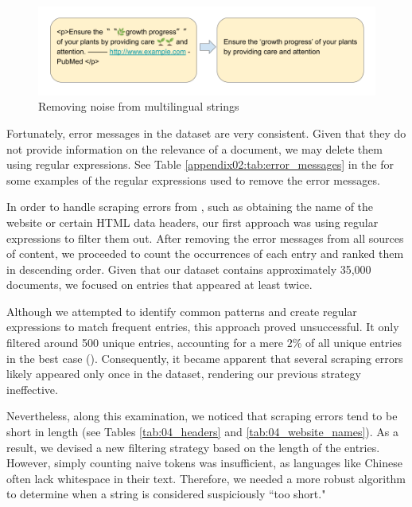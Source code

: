 \begin{figure}
    \centering
    \includegraphics[width=\textwidth]{Figures/05/05_multilingual_string_cleaning.png}
    \caption{Removing noise from multilingual strings}
    \label{fig:05_multilingual_string_cleaning}
\end{figure}


\label{vsi_deleting_error_messages}

Fortunately, error messages in the dataset are very consistent. Given that they do not provide information on the relevance of a document, we may delete them using regular expressions. See Table \ref{appendix02:tab:error_messages} in the \appendixname{} for some examples of the regular expressions used to remove the error messages. 






In order to handle scraping errors from \trafilatura{}, such as obtaining the name of the website or certain HTML data headers, our first approach was using regular expressions to filter them out. After removing the error messages from all sources of content, we proceeded to count the occurrences of each entry and ranked them in descending order. Given that our dataset contains approximately 35,000 documents, we focused on entries that appeared at least twice.

Although we attempted to identify common patterns and create regular expressions to match frequent entries, this approach proved unsuccessful. It only filtered around 500 unique entries, accounting for a mere $2\%$ of all unique entries in the best case (\trafilaturaAbstract{}). Consequently, it became apparent that several scraping errors likely appeared only once in the dataset, rendering our previous strategy ineffective.

Nevertheless, along this examination, we noticed that scraping errors tend to be short in length (see Tables \ref{tab:04_headers} and \ref{tab:04_website_names}). As a result, we devised a new filtering strategy based on the length of the entries. However, simply counting naive tokens was insufficient, as languages like Chinese often lack whitespace in their text. Therefore, we needed a more robust algorithm to determine when a string is considered suspiciously ``too short."

